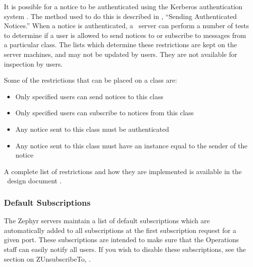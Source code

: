 It is possible for a notice to be authenticated using the Kerberos
authentication system \cite{kerberos-paper}.  The method used to do this
is described in , ``Sending Authenticated
Notices.''  When a notice is authenticated, a
\Zephyr\ server can perform a number of tests to determine if a user is
allowed to send notices to or subscribe to messages from a particular
class.  The lists which determine these restrictions are kept on the
server machines, and may not be updated by users.  They are not
available for inspection by users.

Some of the restrictions that can be placed on a class are:

\begin{itemize}
\item Only specified users can send notices to this class
\item Only specified users can subscribe to notices from this class
\item Any notice sent to this class must be authenticated
\item Any notice sent to this class must have an instance equal to the
sender of the notice
\end{itemize}

A complete list of restrictions and how they are implemented is
available in the \Zephyr\ design document \cite{zephyr-design}.

\subsubsection{Default Subscriptions}
\label{default-subscriptions}
The Zephyr servers maintain a list of default subscriptions which are
automatically added to all subscriptions at the first subscription
request for a given port.  These subscriptions are intended to make sure
that the Operations staff can easily notify all users.  If you wish to
disable these subscriptions, see the section on ZUnsubscribeTo,
.
